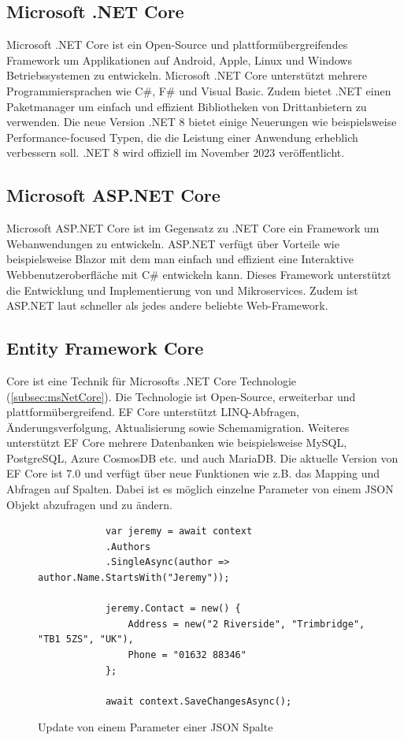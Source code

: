 \documentclass[a4paper, fontsize=11pt, parskip=half, twoside]{scrreprt}
\begin{document}
	\subsection{Microsoft .NET Core} \label{subsec:msNetCore}
	Microsoft .NET Core ist ein Open-Source und plattformübergreifendes Framework um Applikationen auf Android, Apple, Linux und Windows Betriebssystemen zu entwickeln.
	Microsoft .NET Core unterstützt mehrere Programmiersprachen wie C\#, F\# und Visual Basic.
	Zudem bietet .NET einen Paketmanager um einfach und effizient Bibliotheken von Drittanbietern zu verwenden.
	Die neue Version .NET 8 bietet einige Neuerungen wie beispielsweise Performance-focused Typen, die die Leistung einer Anwendung erheblich verbessern soll.
	.NET 8 wird offiziell im November 2023 veröffentlicht.
	
	\textcite{billwagner_net_nodate}
	
	\subsection{Microsoft ASP.NET Core}
	Microsoft ASP.NET Core ist im Gegensatz zu .NET Core ein Framework um Webanwendungen zu entwickeln. 
	ASP.NET verfügt über Vorteile wie beispielsweise Blazor mit dem man einfach und effizient eine Interaktive Webbenutzeroberfläche mit C\# entwickeln kann.
	Dieses Framework unterstützt die Entwicklung und Implementierung von  und Mikroservices.
	Zudem ist ASP.NET laut \textcite{noauthor_techempower_nodate} schneller als jedes andere beliebte Web-Framework.
	
	\textcite{billwagner_net_nodate}
	
	\subsection{Entity Framework Core}
	 Core ist eine  Technik für Microsofts .NET Core Technologie (\autoref{subsec:msNetCore}). 
	Die Technologie ist Open-Source, erweiterbar und plattformübergreifend.
	\ac{EF} Core unterstützt LINQ-Abfragen, Änderungsverfolgung, Aktualisierung sowie Schemamigration.
	Weiteres unterstützt \ac{EF} Core mehrere Datenbanken wie beispielsweise MySQL, PostgreSQL, Azure CosmosDB etc. und auch MariaDB.
	Die aktuelle Version von \ac{EF} Core ist 7.0 und verfügt über neue Funktionen wie z.B. das Mapping und Abfragen auf  Spalten. 
	Dabei ist es möglich einzelne Parameter von einem \ac{JSON} Objekt abzufragen und zu ändern.
	
	\begin{figure}[ht]
		\begin{verbatim}
			var jeremy = await context
			.Authors
			.SingleAsync(author => author.Name.StartsWith("Jeremy"));
			
			jeremy.Contact = new() { 
				Address = new("2 Riverside", "Trimbridge", "TB1 5ZS", "UK"), 
				Phone = "01632 88346" 
			};
		
			await context.SaveChangesAsync();
		\end{verbatim}
		\caption{Update von einem Parameter einer \acl{JSON} Spalte}
	\end{figure}
\end{document}

